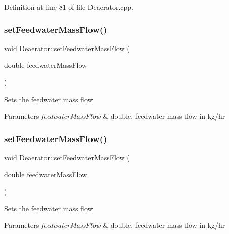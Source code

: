 Definition at line 81 of file Deaerator.\+cpp.

\mbox{\label{class_deaerator_ada95cb2557bc43602d7bcefbad66c853}} 
\subsubsection{\texorpdfstring{set\+Feedwater\+Mass\+Flow()}{setFeedwaterMassFlow()}\hspace{0.1cm}{\footnotesize\ttfamily [2/3]}}
{\footnotesize\ttfamily void Deaerator\+::set\+Feedwater\+Mass\+Flow (\begin{DoxyParamCaption}\item[{double}]{feedwater\+Mass\+Flow }\end{DoxyParamCaption})}

Sets the feedwater mass flow 
\begin{DoxyParams}{Parameters}
{\em feedwater\+Mass\+Flow} & double, feedwater mass flow in kg/hr \\
\hline
\end{DoxyParams}
\mbox{\label{class_deaerator_ada95cb2557bc43602d7bcefbad66c853}} 
\subsubsection{\texorpdfstring{set\+Feedwater\+Mass\+Flow()}{setFeedwaterMassFlow()}\hspace{0.1cm}{\footnotesize\ttfamily [3/3]}}
{\footnotesize\ttfamily void Deaerator\+::set\+Feedwater\+Mass\+Flow (\begin{DoxyParamCaption}\item[{double}]{feedwater\+Mass\+Flow }\end{DoxyParamCaption})}

Sets the feedwater mass flow 
\begin{DoxyParams}{Parameters}
{\em feedwater\+Mass\+Flow} & double, feedwater mass flow in kg/hr \\
\hline
\end{DoxyParams}
\mbox{\label{class_deaerator_a5936221e68b5ba3245f0adabed74e6d7}} 
